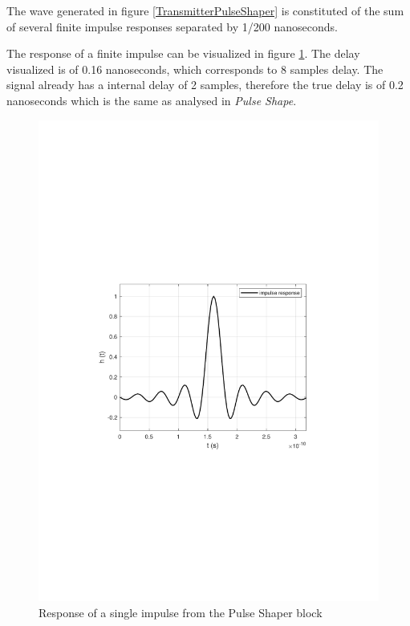 The wave generated in figure \ref{TransmitterPulseShaper} is constituted of the sum of several finite impulse responses separated by 1/200 nanoseconds.

The response of a finite impulse can be visualized in figure \ref{TransmitterImpulseResponse}. The delay visualized is of 0.16 nanoseconds, which corresponds to 8 samples delay. The signal already has a internal delay of 2 samples, therefore the true delay is of 0.2 nanoseconds which is the same as analysed in \textit{Pulse Shape}.

\begin{figure}[h]
	\centering
    \includegraphics[clip, trim=0.5cm 9cm 0.5cm 9cm, width=\textwidth]{./lib/m_qam_transmitter/figures/ImpulseResponse.pdf}
    \caption{Response of a single impulse from the Pulse Shaper block}\label{TransmitterImpulseResponse}
\end{figure}

